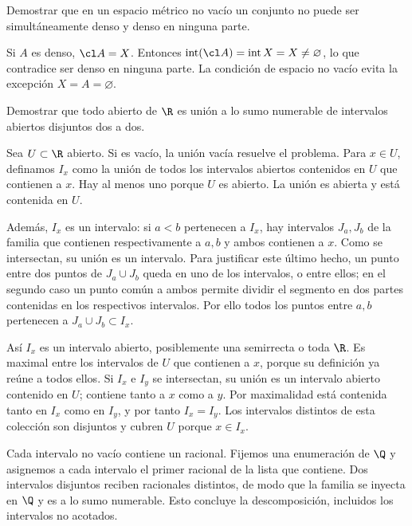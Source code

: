 \begin{ejercicio}\label{ej:lectura-6-7}
Demostrar que en un espacio métrico no vacío un conjunto no puede ser simultáneamente denso y denso en ninguna parte.
\end{ejercicio}
\begin{solucion}
Si $A$ es denso, $\cl A=X$. Entonces $\operatorname{int}(\cl A)=\operatorname{int}X=X\ne\varnothing$, lo que contradice ser denso en ninguna parte. La condición de espacio no vacío evita la excepción $X=A=\varnothing$.
\end{solucion}

\begin{ejercicio}\label{ej:lectura-6-8}\label{ch06:intervalos}
Demostrar que todo abierto de $\R$ es unión a lo sumo numerable de intervalos abiertos disjuntos dos a dos.
\end{ejercicio}
\begin{solucion}
Sea $U\subset\R$ abierto. Si es vacío, la unión vacía resuelve el problema. Para $x\in U$, definamos $I_x$ como la unión de todos los intervalos abiertos contenidos en $U$ que contienen a $x$. Hay al menos uno porque $U$ es abierto. La unión es abierta y está contenida en $U$.

Además, $I_x$ es un intervalo: si $a<b$ pertenecen a $I_x$, hay intervalos $J_a,J_b$ de la familia que contienen respectivamente a $a,b$ y ambos contienen a $x$. Como se intersectan, su unión es un intervalo. Para justificar este último hecho, un punto entre dos puntos de $J_a\cup J_b$ queda en uno de los intervalos, o entre ellos; en el segundo caso un punto común a ambos permite dividir el segmento en dos partes contenidas en los respectivos intervalos. Por ello todos los puntos entre $a,b$ pertenecen a $J_a\cup J_b\subset I_x$.

Así $I_x$ es un intervalo abierto, posiblemente una semirrecta o toda $\R$. Es maximal entre los intervalos de $U$ que contienen a $x$, porque su definición ya reúne a todos ellos. Si $I_x$ e $I_y$ se intersectan, su unión es un intervalo abierto contenido en $U$; contiene tanto a $x$ como a $y$. Por maximalidad está contenida tanto en $I_x$ como en $I_y$, y por tanto $I_x=I_y$. Los intervalos distintos de esta colección son disjuntos y cubren $U$ porque $x\in I_x$.

Cada intervalo no vacío contiene un racional. Fijemos una enumeración de $\Q$ y asignemos a cada intervalo el primer racional de la lista que contiene. Dos intervalos disjuntos reciben racionales distintos, de modo que la familia se inyecta en $\Q$ y es a lo sumo numerable. Esto concluye la descomposición, incluidos los intervalos no acotados.
\end{solucion}

